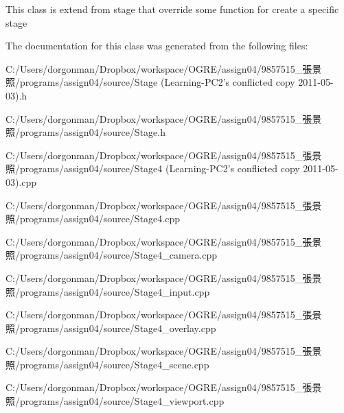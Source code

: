 This class is extend from stage that override some function for create a specific stage 

The documentation for this class was generated from the following files:\begin{DoxyCompactItemize}
\item 
C:/Users/dorgonman/Dropbox/workspace/OGRE/assign04/9857515\_\-張景照/programs/assign04/source/Stage (Learning-\/PC2's conflicted copy 2011-\/05-\/03).h\item 
C:/Users/dorgonman/Dropbox/workspace/OGRE/assign04/9857515\_\-張景照/programs/assign04/source/Stage.h\item 
C:/Users/dorgonman/Dropbox/workspace/OGRE/assign04/9857515\_\-張景照/programs/assign04/source/Stage4 (Learning-\/PC2's conflicted copy 2011-\/05-\/03).cpp\item 
C:/Users/dorgonman/Dropbox/workspace/OGRE/assign04/9857515\_\-張景照/programs/assign04/source/Stage4.cpp\item 
C:/Users/dorgonman/Dropbox/workspace/OGRE/assign04/9857515\_\-張景照/programs/assign04/source/Stage4\_\-camera.cpp\item 
C:/Users/dorgonman/Dropbox/workspace/OGRE/assign04/9857515\_\-張景照/programs/assign04/source/Stage4\_\-input.cpp\item 
C:/Users/dorgonman/Dropbox/workspace/OGRE/assign04/9857515\_\-張景照/programs/assign04/source/Stage4\_\-overlay.cpp\item 
C:/Users/dorgonman/Dropbox/workspace/OGRE/assign04/9857515\_\-張景照/programs/assign04/source/Stage4\_\-scene.cpp\item 
C:/Users/dorgonman/Dropbox/workspace/OGRE/assign04/9857515\_\-張景照/programs/assign04/source/Stage4\_\-viewport.cpp\end{DoxyCompactItemize}
